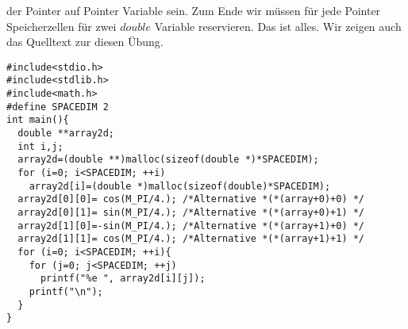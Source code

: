 der Pointer auf Pointer Variable sein. Zum Ende wir müssen für jede Pointer Speicherzellen 
für zwei $double$ Variable reservieren. Das ist alles. Wir zeigen auch das Quelltext zur diesen
Übung.
\begin{lstlisting}
#include<stdio.h>
#include<stdlib.h>
#include<math.h>
#define SPACEDIM 2 
int main(){
  double **array2d;
  int i,j;
  array2d=(double **)malloc(sizeof(double *)*SPACEDIM);
  for (i=0; i<SPACEDIM; ++i)
    array2d[i]=(double *)malloc(sizeof(double)*SPACEDIM); 
  array2d[0][0]= cos(M_PI/4.); /*Alternative *(*(array+0)+0) */
  array2d[0][1]= sin(M_PI/4.); /*Alternative *(*(array+0)+1) */
  array2d[1][0]=-sin(M_PI/4.); /*Alternative *(*(array+1)+0) */
  array2d[1][1]= cos(M_PI/4.); /*Alternative *(*(array+1)+1) */ 
  for (i=0; i<SPACEDIM; ++i){
    for (j=0; j<SPACEDIM; ++j)
      printf("%e ", array2d[i][j]);
    printf("\n");
  }
}
\end{lstlisting}
